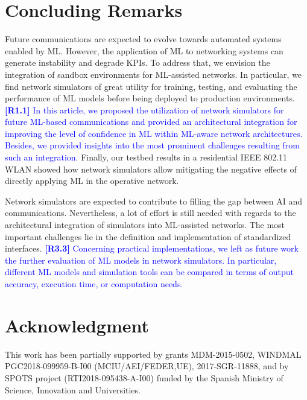 \documentclass[journal]{IEEEtran}
\begin{document}
	\section{Concluding Remarks}
	Future communications are expected to evolve towards automated systems enabled by ML. However, the application of ML to networking systems can generate instability and degrade KPIs. To address that, we envision the integration of sandbox environments for ML-assisted networks. In particular, we find network simulators of great utility for training, testing, and evaluating the performance of ML models before being deployed to production environments. \textcolor{blue}{\textbf{[R1.1]} In this article, we proposed the utilization of network simulators for future ML-based communications and provided an architectural integration for improving the level of confidence in ML within ML-aware network architectures. Besides, we provided insights into the most prominent challenges resulting from such an integration}. Finally, our testbed results in a residential IEEE 802.11 WLAN showed how network simulators allow mitigating the negative effects of directly applying ML in the operative network. 
		
	Network simulators are expected to contribute to filling the gap between AI and communications. Nevertheless, a lot of effort is still needed with regards to the architectural integration of simulators into ML-assisted networks. The most important challenges lie in the definition and implementation of standardized interfaces. \textcolor{blue}{\textbf{[R3.3]} Concerning practical implementations, we left as future work the further evaluation of ML models in network simulators. In particular, different ML models and simulation tools can be compared in terms of output accuracy, execution time, or computation needs.}

	\section*{Acknowledgment}
	This work has been partially supported by grants MDM-2015-0502, WINDMAL PGC2018-099959-B-I00 (MCIU/AEI/FEDER,UE), 2017-SGR-11888, and by SPOTS project (RTI2018-095438-A-I00) funded by the Spanish Ministry of Science, Innovation and Universities.
	
	\ifCLASSOPTIONcaptionsoff
	\newpage
	\fi
	
\end{document}

